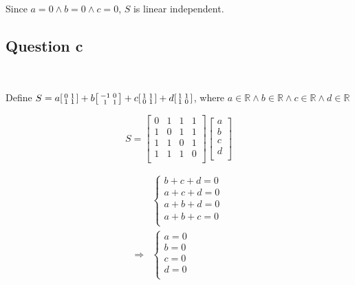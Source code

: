 \documentclass{article}
\def\R{\mathbb{R}}
\begin{document}
Since $a=0\land b=0\land c=0$, $S$ is linear independent.

\subsection{Question c}

~

Define $S=a\begin{bsmallmatrix}0&1\\1&1\end{bsmallmatrix}+b\begin{bsmallmatrix}-1&0\\1&1\end{bsmallmatrix}+c\begin{bsmallmatrix}1&1\\0&1\end{bsmallmatrix}+d\begin{bsmallmatrix}1&1\\1&0\end{bsmallmatrix}$, where $a\in\R\land b\in\R\land c\in\R\land d\in\R$

\begin{equation}
\tag{3.3-1}
S = \begin{bmatrix}
0&1&1&1\\
1&0&1&1\\
1&1&0&1\\
1&1&1&0\\
\end{bmatrix}
\begin{bmatrix}
a\\
b\\
c\\
d\\
\end{bmatrix}
\end{equation}

\begin{equation}
\tag{3.3-2}
\begin{split}
&\begin{cases}
b+c+d=0\\
a+c+d=0\\
a+b+d=0\\
a+b+c=0\\
\end{cases}\\
\Rightarrow &\begin{cases}
a=0\\
b=0\\
c=0\\
d=0\\
\end{cases}\\
\end{split}
\end{equation}
\end{document}
